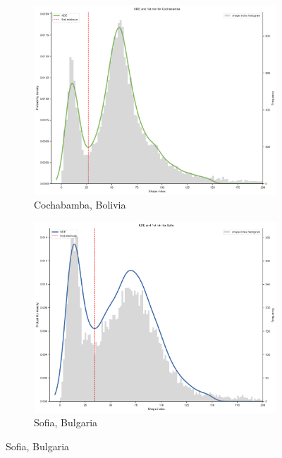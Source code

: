 \begin{figure}
    \centering
    \begin{subfigure}[b]{0.475\textwidth}
        \centering
        \includegraphics[width=\textwidth]{figures/800}
        \caption[]%
        {{\small Cochabamba, Bolivia}}    
        \label{fig:kde-cochabamba}
    \end{subfigure}
    \hfill
    \begin{subfigure}[b]{0.475\textwidth}  
        \centering 
        \includegraphics[width=\textwidth]{figures/15}
        \caption[]%
        {{\small Sofia, Bulgaria}}    
        \label{fig:2}
    \end{subfigure}

\end{figure}
